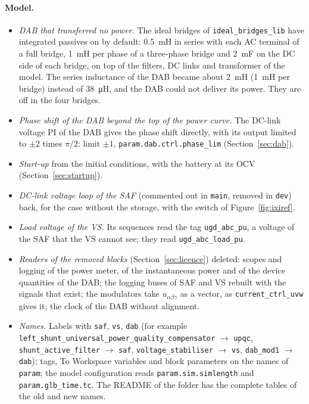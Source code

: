 \documentclass[11pt,a4paper]{scrartcl}
\newcommand{\code}[1]{\texttt{#1}}
\begin{document}
\begin{onehalfspace}
\paragraph{Model.}
\begin{itemize}[nosep]
	\item \emph{DAB that transferred no power.} The ideal bridges of \code{ideal\_bridges\_lib} have integrated passives on by default: \SI{0.5}{mH} in series with each AC terminal of a full bridge, \SI{1}{mH} per phase of a three-phase bridge and \SI{2}{mF} on the DC side of each bridge, on top of the filters, DC links and transformer of the model. The series inductance of the DAB became about \SI{2}{mH} (\SI{1}{mH} per bridge) instead of \SI{38}{\micro\henry}, and the DAB could not deliver its power. They are off in the four bridges.
	\item \emph{Phase shift of the DAB beyond the top of the power curve.} The DC-link voltage PI of the DAB gives the phase shift directly, with its output limited to $\pm 2$ times $\pi/2$: limit $\pm 1$, \code{param.dab.ctrl.phase\_lim} (Section~\ref{sec:dab}).
	\item \emph{Start-up} from the initial conditions, with the battery at its OCV (Section~\ref{sec:startup}).
	\item \emph{DC-link voltage loop of the SAF} (commented out in \code{main}, removed in \code{dev}) back, for the case without the storage, with the switch of Figure~\ref{fig:ixiref}.
	\item \emph{Load voltage of the VS.} Its sequences read the tag \code{ugd\_abc\_pu}, a voltage of the SAF that the VS cannot see; they read \code{ugd\_abc\_load\_pu}.
	\item \emph{Readers of the removed blocks} (Section~\ref{sec:licence}) deleted: scopes and logging of the power meter, of the instantaneous power and of the device quantities of the DAB; the logging buses of SAF and VS rebuilt with the signals that exist; the modulators take $u_{\alpha\beta\gamma}$ as a vector, as \code{current\_ctrl\_uvw} gives it; the clock of the DAB without alignment.
	\item \emph{Names.} Labels with \code{saf}, \code{vs}, \code{dab} (for example \code{left\_shunt\_universal\_power\_\allowbreak quality\_compensator} $\to$ \code{upqc}, \code{shunt\_active\_filter} $\to$ \code{saf}, \code{voltage\_stabiliser} $\to$ \code{vs}, \code{dab\_mod1} $\to$ \code{dab}); tags, To Workspace variables and block parameters on the names of \code{param}; the model configuration reads \code{param.sim.simlength} and \code{param.glb\_time.tc}. The README of the folder has the complete tables of the old and new names.
\end{itemize}


\end{onehalfspace}
\end{document}
